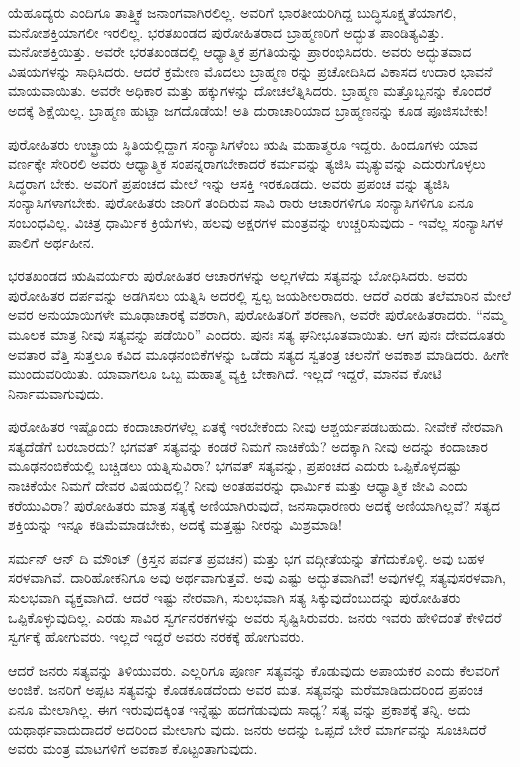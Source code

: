 ಯೆಹೂದ್ಯರು ಎಂದಿಗೂ ತಾತ್ತ್ವಿಕ ಜನಾಂಗವಾಗಿರಲಿಲ್ಲ. ಅವರಿಗೆ ಭಾರತೀಯರಿಗಿದ್ದ ಬುದ್ಧಿಸೂಕ್ಷ್ಮತೆಯಾಗಲಿ, ಮನೋಶಕ್ತಿಯಾಗಲೀ ಇರಲಿಲ್ಲ. ಭರತಖಂಡದ ಪುರೋಹಿತರಾದ ಬ್ರಾಹ್ಮಣರಿಗೆ ಅದ್ಭುತ ಪಾಂಡಿತ್ಯವಿತ್ತು. ಮನೋಶಕ್ತಿಯಿತ್ತು. ಅವರೇ ಭರತಖಂಡದಲ್ಲಿ ಆಧ್ಯಾತ್ಮಿಕ ಪ್ರಗತಿಯನ್ನು ಪ್ರಾರಂಭಿಸಿದರು. ಅವರು ಅದ್ಭುತವಾದ ವಿಷಯಗಳನ್ನು ಸಾಧಿಸಿದರು. ಆದರೆ ಕ್ರಮೇಣ ಮೊದಲು ಬ್ರಾಹ್ಮಣ ರನ್ನು ಪ್ರಚೋದಿಸಿದ ವಿಕಾಸದ ಉದಾರ ಭಾವನೆ ಮಾಯವಾಯಿತು. ಅವರೇ ಅಧಿಕಾರ ಮತ್ತು ಹಕ್ಕುಗಳನ್ನು ದೋಚಲೆತ್ನಿಸಿದರು. ಬ್ರಾಹ್ಮಣ ಮತ್ತೊಬ್ಬನನ್ನು ಕೊಂದರೆ ಅದಕ್ಕೆ ಶಿಕ್ಷೆಯಿಲ್ಲ. ಬ್ರಾಹ್ಮಣ ಹುಟ್ಟಾ ಜಗದೊಡೆಯ! ಅತಿ ದುರಾಚಾರಿಯಾದ ಬ್ರಾಹ್ಮಣನನ್ನು ಕೂಡ ಪೂಜಿಸಬೇಕು!

ಪುರೋಹಿತರು ಉಚ್ಛ್ರಾಯ ಸ್ಥಿತಿಯಲ್ಲಿದ್ದಾಗ ಸಂನ್ಯಾಸಿಗಳೆಂಬ ಋಷಿ ಮಹಾತ್ಮರೂ ಇದ್ದರು. ಹಿಂದೂಗಳು ಯಾವ ವರ್ಣಕ್ಕೇ ಸೇರಿರಲಿ ಅವರು ಆಧ್ಯಾತ್ಮಿಕ ಸಂಪನ್ನರಾಗ\-ಬೇಕಾದರೆ ಕರ್ಮವನ್ನು ತ್ಯಜಿಸಿ ಮೃತ್ಯುವನ್ನು ಎದುರುಗೊಳ್ಳಲು ಸಿದ್ಧರಾಗ ಬೇಕು. ಅವರಿಗೆ ಪ್ರಪಂಚದ ಮೇಲೆ ಇನ್ನು ಆಸಕ್ತಿ ಇರಕೂಡದು. ಅವರು ಪ್ರಪಂಚ ವನ್ನು ತ್ಯಜಿಸಿ ಸಂನ್ಯಾಸಿಗಳಾಗಬೇಕು. ಪುರೋಹಿತರು ಜಾರಿಗೆ ತಂದಿರುವ ಸಾವಿ ರಾರು ಆಚಾರಗಳಿಗೂ ಸಂನ್ಯಾಸಿಗಳಿಗೂ ಏನೂ ಸಂಬಂಧವಿಲ್ಲ. ವಿಚಿತ್ರ ಧಾರ್ಮಿಕ ಕ್ರಿಯೆಗಳು, ಹಲವು ಅಕ್ಷರಗಳ ಮಂತ್ರವನ್ನು ಉಚ್ಚರಿಸುವುದು - ಇವೆಲ್ಲ ಸಂನ್ಯಾಸಿಗಳ ಪಾಲಿಗೆ ಅರ್ಥಹೀನ.

ಭರತಖಂಡದ ಋಷಿವರ್ಯರು ಪುರೋಹಿತರ ಆಚಾರಗಳನ್ನು ಅಲ್ಲಗಳೆದು ಸತ್ಯವನ್ನು ಬೋಧಿಸಿದರು. ಅವರು ಪುರೋಹಿತರ ದರ್ಪವನ್ನು ಅಡಗಿಸಲು ಯತ್ನಿಸಿ ಅದರಲ್ಲಿ ಸ್ವಲ್ಪ ಜಯಶೀಲರಾದರು. ಆದರೆ ಎರಡು ತಲೆಮಾರಿನ ಮೇಲೆ ಅವರ ಅನುಯಾಯಿಗಳೇ ಮೂಢಾಚಾರಕ್ಕೆ ವಶರಾಗಿ, ಪುರೋಹಿತರಿಗೆ ಶರಣಾಗಿ, ಅವರೇ ಪುರೋಹಿತರಾದರು. “ನಮ್ಮ ಮೂಲಕ ಮಾತ್ರ ನೀವು ಸತ್ಯವನ್ನು ಪಡೆಯಿರಿ” ಎಂದರು. ಪುನಃ ಸತ್ಯ ಘನೀಭೂತವಾಯಿತು. ಆಗ ಪುನಃ ದೇವದೂತರು ಅವತಾರ ವೆತ್ತಿ ಸುತ್ತಲೂ ಕವಿದ ಮೂಢನಂಬಿಕೆಗಳನ್ನು ಒಡೆದು ಸತ್ಯದ ಸ್ವತಂತ್ರ ಚಲನೆಗೆ ಅವಕಾಶ ಮಾಡಿದರು. ಹೀಗೇ ಮುಂದುವರಿಯಿತು. ಯಾವಾಗಲೂ ಒಬ್ಬ ಮಹಾತ್ಮ ವ್ಯಕ್ತಿ ಬೇಕಾಗಿದೆ. ಇಲ್ಲದೆ ಇದ್ದರೆ, ಮಾನವ ಕೋಟಿ ನಿರ್ನಾಮವಾಗುವುದು.

ಪುರೋಹಿತರ ಇಷ್ಟೊಂದು ಕಂದಾಚಾರಗಳೆಲ್ಲ ಏತಕ್ಕೆ ಇರಬೇಕೆಂದು ನೀವು ಆಶ್ಚರ್ಯಪಡಬಹುದು. ನೀವೇಕೆ ನೇರವಾಗಿ ಸತ್ಯದೆಡೆಗೆ ಬರಬಾರದು? ಭಗವತ್​ ಸತ್ಯವನ್ನು ಕಂಡರೆ ನಿಮಗೆ ನಾಚಿಕೆಯೆ? ಅದಕ್ಕಾಗಿ ನೀವು ಅದನ್ನು ಕಂದಾಚಾರ ಮೂಢನಂಬಿಕೆಯಲ್ಲಿ ಬಚ್ಚಿಡಲು ಯತ್ನಿಸುವಿರಾ? ಭಗವತ್​ ಸತ್ಯವನ್ನು, ಪ್ರಪಂಚದ ಎದುರು ಒಪ್ಪಿಕೊಳ್ಳದಷ್ಟು ನಾಚಿಕೆಯೇ ನಿಮಗೆ ದೇವರ ವಿಷಯದಲ್ಲಿ? ನೀವು ಅಂತಹವರನ್ನು ಧಾರ್ಮಿಕ ಮತ್ತು ಆಧ್ಯಾತ್ಮಿಕ ಜೀವಿ ಎಂದು ಕರೆಯುವಿರಾ? ಪುರೋಹಿತರು ಮಾತ್ರ ಸತ್ಯಕ್ಕೆ ಅಣಿಯಾಗಿರುವುದೆ, ಜನಸಾಧಾರಣರು ಅದಕ್ಕೆ ಅಣಿಯಾಗಿಲ್ಲವೆ? ಸತ್ಯದ ಶಕ್ತಿಯನ್ನು ಇನ್ನೂ ಕಡಿಮೆಮಾಡಬೇಕು, ಅದಕ್ಕೆ ಮತ್ತಷ್ಟು ನೀರನ್ನು ಮಿಶ್ರಮಾಡಿ!

ಸರ್ಮನ್​ ಆನ್​ ದಿ ಮೌಂಟ್​ (ಕ್ರಿಸ್ತನ ಪರ್ವತ ಪ್ರವಚನ) ಮತ್ತು ಭಗ ವದ್ಗೀತೆಯನ್ನು ತೆಗೆದುಕೊಳ್ಳಿ. ಅವು ಬಹಳ ಸರಳವಾಗಿವೆ. ದಾರಿಹೋಕನಿಗೂ ಅವು ಅರ್ಥವಾಗುತ್ತವೆ. ಅವು ಎಷ್ಟು ಅದ್ಭುತವಾಗಿವೆ! ಅವುಗಳಲ್ಲಿ ಸತ್ಯವುಸರಳವಾಗಿ, ಸುಲಭವಾಗಿ ವ್ಯಕ್ತವಾಗಿದೆ. ಆದರೆ ಇಷ್ಟು ನೇರವಾಗಿ, ಸುಲಭವಾಗಿ ಸತ್ಯ ಸಿಕ್ಕುವುದೆಂಬುದನ್ನು ಪುರೋಹಿತರು ಒಪ್ಪಿಕೊಳ್ಳುವುದಿಲ್ಲ. ಎರಡು ಸಾವಿರ ಸ್ವರ್ಗನರಕಗಳನ್ನು ಅವರು ಸೃಷ್ಟಿಸಿರುವರು. ಜನರು ಇವರು ಹೇಳಿದಂತೆ ಕೇಳಿದರೆ ಸ್ವರ್ಗಕ್ಕೆ ಹೋಗುವರು. ಇಲ್ಲದೆ ಇದ್ದರೆ ಅವರು ನರಕಕ್ಕೆ ಹೋಗುವರು.

ಆದರೆ ಜನರು ಸತ್ಯವನ್ನು ತಿಳಿಯುವರು. ಎಲ್ಲರಿಗೂ ಪೂರ್ಣ ಸತ್ಯವನ್ನು ಕೊಡುವುದು ಅಪಾಯಕರ ಎಂದು ಕೆಲವರಿಗೆ ಅಂಜಿಕೆ. ಜನರಿಗೆ ಅಪ್ಪಟ ಸತ್ಯವನ್ನು ಕೊಡಕೂಡದೆಂದು ಅವರ ಮತ. ಸತ್ಯವನ್ನು ಮರೆಮಾಡಿದುದರಿಂದ ಪ್ರಪಂಚ ಏನೂ ಮೇಲಾಗಿಲ್ಲ. ಈಗ ಇರುವುದಕ್ಕಿಂತ ಇನ್ನೆಷ್ಟು ಹದಗೆಡುವುದು ಸಾಧ್ಯ? ಸತ್ಯ ವನ್ನು ಪ್ರಕಾಶಕ್ಕೆ ತನ್ನಿ. ಅದು ಯಥಾರ್ಥವಾದುದಾದರೆ ಅದರಿಂದ ಮೇಲಾಗು ವುದು. ಜನರು ಅದನ್ನು ಒಪ್ಪದೆ ಬೇರೆ ಮಾರ್ಗವನ್ನು ಸೂಚಿಸಿದರೆ ಅವರು ಮಂತ್ರ ಮಾಟಗಳಿಗೆ ಅವಕಾಶ ಕೊಟ್ಟಂತಾಗುವುದು.

